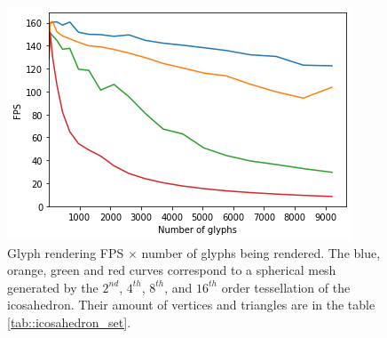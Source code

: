 \documentclass[twoside,twocolumn,10pt]{article}
\begin{document}
\begin{figure}[ht]
    \centering
    \includegraphics[width=1.00\linewidth, angle=0]{figs/Benchmark/benchmark_half.png}
    \caption{Glyph rendering FPS $\times$ number of glyphs being rendered. The blue, orange, green and red curves correspond to a spherical mesh  generated by the $2^{nd}$, $4^{th}$, $8^{th}$, and $16^{th}$ order tessellation of the icosahedron. Their amount of vertices and triangles are in the table \ref{tab::icosahedron_set}.
    }
    \label{fig::benchmark}
\end{figure}
\end{document}
